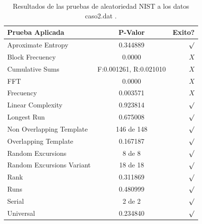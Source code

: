 \documentclass[10pt]{IEEEtran}
\begin{document}
\begin{table}[H]
\caption{Resultados de las pruebas de aleatoriedad NIST a los datos caso2.dat .}
\label{caso1}
\begin{center}
\begin{small}
\begin{tabular}{|l|c|r|}
\hline

Prueba Aplicada &  P-Valor & Exito? \\
\hline

Aproximate Entropy    &    0.344889 & $\surd$ \\

Block Frecuency  & 0.0000  &  $X$  \\

Cumulative Sums    &   F:0.001261, R:0.021010    & $X$ \\

FFT    &   0.0000 &   $X$      \\

Frecuency     &  0.003571 &  $X$   \\

Linear Complexity      & 0.923814 & $\surd$ \\

Longest Run      &   0.675008 &    $\surd$      \\

Non Overlapping Template      & 146 de 148    &     $\surd$          \\

Overlapping Template      &  0.167187  &       $\surd$        \\

Random Excursions      & 8 de 8  &    $\surd$      \\

Random Excursions Variant & 18 de 18 &     $\surd$    \\

Rank &  0.311869 &      $\surd$      \\

Runs &     0.480999 &     $\surd$        \\

Serial &     2 de 2    &     $\surd$        \\

Universal &      0.234840   &   $\surd$            \\

\hline

\end{tabular}
\end{small}
\end{center}
\end{table}
\end{document}
